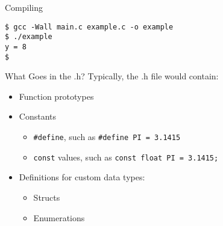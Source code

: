 \documentclass[graphics]{beamer}
\begin{document}
\begin{frame}[fragile]{Compiling}
    \begin{verbatim}
$ gcc -Wall main.c example.c -o example
$ ./example
y = 8
$
    \end{verbatim}
\end{frame}

\begin{frame}{What Goes in the .h?}
    Typically, the .h file would contain:
    \begin{itemize}
        \item Function prototypes
        \item Constants
        \begin{itemize}
            \item \texttt{\#define}, such as \texttt{\#define PI = 3.1415}
            \item \texttt{const} values, such as \texttt{const float PI = 3.1415;}
        \end{itemize}
        \item Definitions for custom data types:
        \begin{itemize}
            \item Structs
            \item Enumerations
        \end{itemize}
    \end{itemize}
\end{frame}
\end{document}
